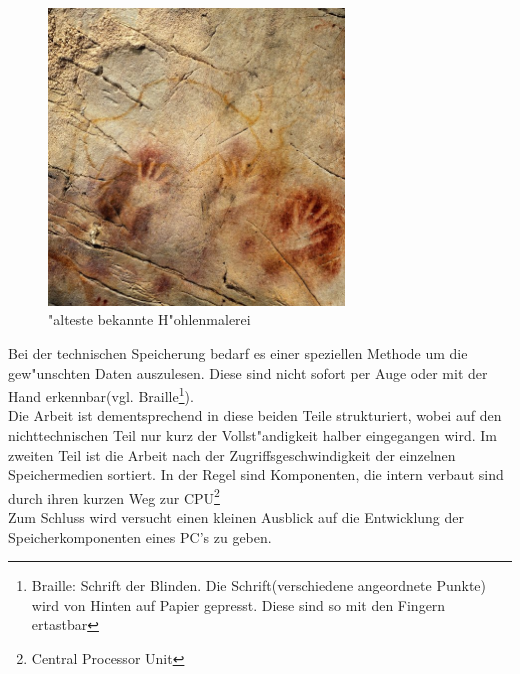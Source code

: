 \begin{figure}[ht]
\centering
\includegraphics[width=0.7\textwidth]{images/hohlenmalerei.jpeg} 
\caption{"alteste bekannte H"ohlenmalerei}
\label{fig:hohlenmalerei}
\end{figure}

Bei der technischen Speicherung bedarf es einer speziellen Methode um die gew"unschten Daten auszulesen. Diese sind nicht sofort per Auge oder mit der Hand erkennbar(vgl. Braille\footnote{Braille: Schrift der Blinden. Die Schrift(verschiedene angeordnete Punkte) wird von Hinten auf Papier gepresst. Diese sind so mit den Fingern ertastbar}). 
\\
Die Arbeit ist dementsprechend in diese beiden Teile strukturiert, wobei auf den nichttechnischen Teil nur kurz der Vollst"andigkeit halber eingegangen wird.
Im zweiten Teil ist die Arbeit nach der Zugriffsgeschwindigkeit der einzelnen Speichermedien sortiert. In der Regel sind Komponenten, die intern verbaut sind durch ihren kurzen Weg zur CPU\footnote{Central Processor Unit}
\\
Zum Schluss wird versucht einen kleinen Ausblick auf die Entwicklung der Speicherkomponenten eines PC's zu geben.




